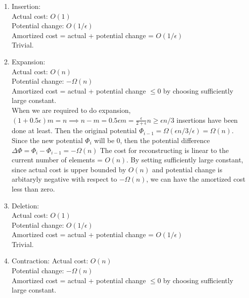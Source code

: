 \documentclass[12pt]{article}
\begin{document}
\begin{enumerate}
  
\item{Insertion:}\\
Actual cost: $O(1)$\\
Potential change: $O(1/\epsilon)$\\
Amortized cost = actual + potential change = $O(1/\epsilon)$\\

Trivial.\\

\item{Expansion:}\\
Actual cost: $O(n)$\\
Potential change: $-\Omega(n)$\\
Amortized cost = actual + potential change $\le 0$ by choosing sufficiently large constant.\\


When we are required to do expansion, 
$(1+0.5\epsilon)m = n \implies n-m = 0.5\epsilon m = \frac{\epsilon}{2+\epsilon}n \ge \epsilon n/3 $ insertions have been done at least.
Then the original potential $\Phi_{i-1} = \Omega(\epsilon n/3/\epsilon) = \Omega(n)$.
Since the new potential $\Phi_i$ will be $0$,
then the potential difference $\Delta \Phi = \Phi_i - \Phi_{i-1} = -\Omega(n)$
The cost for reconstructing is linear to the current number of elements = $O(n)$.
By setting sufficiently large constant,
since actual cost is upper bounded by $O(n)$ and potential change is arbitaryly negative with respect to $-\Omega(n)$,
we can have the amortized cost less than zero.

\item{Deletion:}\\
Actual cost: $O(1)$\\
Potential change: $O(1/\epsilon)$\\
Amortized cost = actual + potential change = $O(1/\epsilon)$\\

Trivial.\\

\item{Contraction:}
Actual cost: $O(n)$ \\
Potential change: $-\Omega(n)$ \\
Amortized cost = actual + potential change $\le 0$ by choosing sufficiently large constant.


\end{enumerate}
\end{document}
